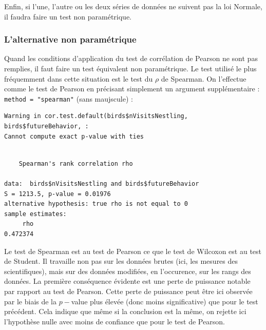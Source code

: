 \documentclass[
  a4paper,
]{article}
\newenvironment{Shaded}{\begin{snugshade}}{\end{snugshade}}
\newcommand{\DataTypeTok}[1]{\textcolor[rgb]{0.00,0.34,0.68}{#1}}
\newcommand{\KeywordTok}[1]{\textcolor[rgb]{0.12,0.11,0.11}{\textbf{#1}}}
\newcommand{\NormalTok}[1]{\textcolor[rgb]{0.12,0.11,0.11}{#1}}
\newcommand{\OperatorTok}[1]{\textcolor[rgb]{0.12,0.11,0.11}{#1}}
\newcommand{\StringTok}[1]{\textcolor[rgb]{0.75,0.01,0.01}{#1}}
\begin{document}
Enfin, si l'une, l'autre ou les deux séries de données ne suivent pas la loi Normale, il faudra faire un test non paramétrique.

\hypertarget{lalternative-non-paramuxe9trique-4}{%
\subsubsection{L'alternative non paramétrique}\label{lalternative-non-paramuxe9trique-4}}

Quand les conditions d'application du test de corrélation de Pearson ne sont pas remplies, il faut faire un test équivalent non paramétrique. Le test utilisé le plus fréquemment dans cette situation est le test du \(\rho\) de Spearman. On l'effectue comme le test de Pearson en précisant simplement un argument supplémentaire : \texttt{method\ =\ "spearman"} (sans maujscule) :

\begin{Shaded}
\end{Shaded}

\begin{verbatim}
Warning in cor.test.default(birds$nVisitsNestling, birds$futureBehavior, :
Cannot compute exact p-value with ties
\end{verbatim}

\begin{verbatim}

    Spearman's rank correlation rho

data:  birds$nVisitsNestling and birds$futureBehavior
S = 1213.5, p-value = 0.01976
alternative hypothesis: true rho is not equal to 0
sample estimates:
     rho 
0.472374 
\end{verbatim}

Le test de Spearman est au test de Pearson ce que le test de Wilcoxon est au test de Student. Il travaille non pas sur les données brutes (ici, les mesures des scientifiques), mais sur des données modifiées, en l'occurence, sur les rangs des données. La première conséquence évidente est une perte de puissance notable par rapport au test de Pearson. Cette perte de puissance peut être ici observée par le biais de la \(p-\)value plus élevée (donc moins significative) que pour le test précédent. Cela indique que même si la conclusion est la même, on rejette ici l'hypothèse nulle avec moins de confiance que pour le test de Pearson.
\end{document}
